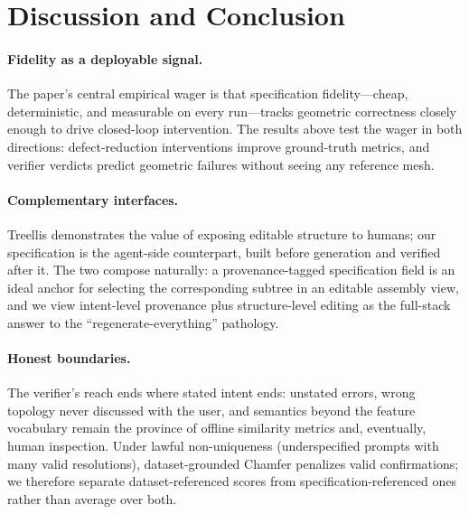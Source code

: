 \section{Discussion and Conclusion}\label{sec:discussion}

\paragraph{Fidelity as a deployable signal.}
The paper's central empirical wager is that specification fidelity---cheap,
deterministic, and measurable on every run---tracks geometric correctness
closely enough to drive closed-loop intervention. The results above test the
wager in both directions: defect-reduction interventions improve
ground-truth metrics, and verifier verdicts predict geometric failures
without seeing any reference mesh.

\paragraph{Complementary interfaces.}
Treellis demonstrates the value of exposing editable structure to humans;
our specification is the agent-side counterpart, built before generation and
verified after it. The two compose naturally: a provenance-tagged
specification field is an ideal anchor for selecting the corresponding
subtree in an editable assembly view, and we view intent-level provenance
plus structure-level editing as the full-stack answer to the
``regenerate-everything'' pathology.

\paragraph{Honest boundaries.}
The verifier's reach ends where stated intent ends: unstated errors,
wrong topology never discussed with the user, and semantics beyond the
feature vocabulary remain the province of offline similarity metrics and,
eventually, human inspection. Under lawful non-uniqueness (underspecified
prompts with many valid resolutions), dataset-grounded Chamfer penalizes
valid confirmations; we therefore separate dataset-referenced scores from
specification-referenced ones rather than average over both.

